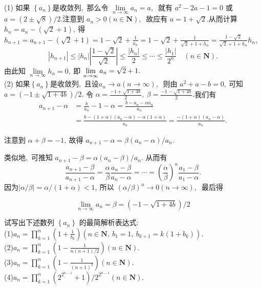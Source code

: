 	\begin{solution}
		(1) 如果 $ \left\{a_{n}\right\}  $是收敛列,\  那么令  $\lim\limits_{n \rightarrow \infty} a_{n}=a ,\ $ 就有  $a^{2}-2 a-1=0 $ 或 $ a=(2 \pm   \sqrt{8}) / 2 . $注意到 $ a_{n}>0(n \in \mathbf{N}) ,\ $ 故应有  $a=1+\sqrt{2} . $从而计算  $h_{n}=a_{n}-(\sqrt{2}+1) ,\  $得  $h_{n+1}=a_{n+1}-(\sqrt{2}+1)=1-\sqrt{2}+\frac{1}{a_{n}}=1-\sqrt{2}+\frac{1}{\sqrt{2}+1+h_{n}}=\frac{1-\sqrt{2}}{\sqrt{2}+1+h_{n}} h_{n} ,\ $
		$$\left|h_{n+1}\right| \leqslant\left|h_{n}\right|\left|\frac{1-\sqrt{2}}{\sqrt{2}}\right| \leqslant \frac{\left|h_{n}\right|}{2} \leqslant \cdots \leqslant \frac{\left|h_{1}\right|}{2^{n}} \quad(n \in \mathbf{N}) .$$
		由此知 $ \lim\limits _{n \rightarrow \infty} h_{n}=0 ,\  $即  $\lim\limits\limits_{n \rightarrow \infty} a_{n}=\sqrt{2}+1 .$
		~\\
		
		(2) 如果$  \left\{a_{n}\right\}  $是收敛列,\  且设$  a_{n} \rightarrow a(n \rightarrow \infty) ,\ $ 则由 $ a^{2}+a-b=0 ,\  $可知$  a= 
		(-1 \pm \sqrt{1+4 b}) / 2 .$ 令 $ \alpha=\frac{-1+\sqrt{1+4 b}}{2},\  \beta=\frac{-1-\sqrt{1+4 b}}{2} . $我们有 $$
		\begin{aligned}
			a_{n+1}-\alpha&=\frac{b}{a_{n}}-1-\alpha=\frac{b-a_{n}-\alpha a_{n}}{a_{n}}\\
			&	=\frac{b-(1+\alpha)\left(a_{n}-\alpha\right)-\alpha(1+\alpha)}{a_{n}}=\frac{-(1+\alpha)\left(a_{n}-\alpha\right)}{a_{n}} .
		\end{aligned}$$
		
		注意到  $\alpha+\beta=-1 ,\  $故得  $a_{n+1}-\alpha=\beta\left(a_{n}-\alpha\right) / a_{n} .$
		
		类似地,\  可推知 $ a_{n+1}-\beta=\alpha\left(a_{n}-\beta\right) / a_{n} .$ 从而有
		$$\frac{a_{n+1}-\beta}{a_{n+1}-\alpha}=\frac{\alpha}{\beta} \frac{a_{n}-\beta}{a_{n}-\alpha}=\cdots=\left(\frac{\alpha}{\beta}\right)^{n} \frac{a_{1}-\beta}{a_{1}-\alpha} .$$
		因为$ |\alpha / \beta|=\alpha /(1+\alpha)<1 ,\  $所以 $ (\alpha / \beta)^{n} \rightarrow 0(n \rightarrow \infty) ,\ $ 最后得
		
		$$\lim\limits_{n \rightarrow \infty} a_{n}=\beta=(-1-\sqrt{1+4 b}) / 2$$ 
	\end{solution}
	\newpage
	\begin{problem}
		试写出下述数列 $ \left\{a_{n}\right\} $ 的最简解析表达式:\\
		(1)$  a_{n}=\prod_{k=1}^{n}\left(1+\frac{1}{b_{k}}\right)\left(n \in \mathbf{N},\  b_{1}=1,\  b_{k+1}=k\left(1+b_{k}\right)\right) .$\\
		(2)$  a_{n}=\prod_{k=1}^{n}\left(1-\frac{1}{n(n+1) / 2}\right)(n \in \mathbf{N}) .$\\
		(3)$  a_{n}=\prod_{k=1}^{n}\left(1-\frac{1}{(n+1)^{2}}\right)(n \in \mathbf{N}) .$\\
		(4)$  a_{n}=\prod_{k=1}^{n}\left(2^{2^{n-1}}+1\right) / 2^{2^{n-1}}(n \in \mathbf{N}) .$\\
	\end{problem}
	
